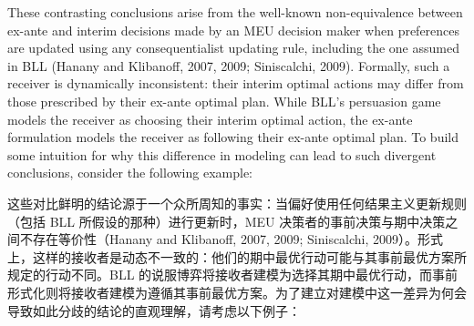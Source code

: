 \documentclass[12pt,a4paper]{article}
\theoremstyle{definition}
\theoremstyle{remark}
\newenvironment{original}{%
    \par\medskip\noindent%
    \begin{tcolorbox}[%
        colback=white,%
        colframe=black!50,%
        title=\textbf{Original English},%
        fonttitle=\small\bfseries,%
        left=0pt, right=0pt, top=2pt, bottom=2pt,%
        boxrule=0.5pt,%
        arc=0pt,%
        outer arc=0pt%
    ]%
    \small%
}{%
    \end{tcolorbox}%
}
\newenvironment{translation}{%
    \par\smallskip\noindent%
    \begin{tcolorbox}[%
        colback=blue!3!white,%
        colframe=blue!40!black,%
        title=\textbf{中文翻译},%
        fonttitle=\small\bfseries,%
        left=0pt, right=0pt, top=2pt, bottom=2pt,%
        boxrule=0.5pt,%
        arc=0pt,%
        outer arc=0pt%
    ]%
    \small\color{blue!60!black}%
}{%
    \end{tcolorbox}\medskip%
}
\begin{document}
\begin{original}
These contrasting conclusions arise from the well-known non-equivalence between ex-ante and interim decisions made by an MEU decision maker when preferences are updated using any consequentialist updating rule, including the one assumed in BLL (Hanany and Klibanoff, 2007, 2009; Siniscalchi, 2009). Formally, such a receiver is dynamically inconsistent: their interim optimal actions may differ from those prescribed by their ex-ante optimal plan. While BLL's persuasion game models the receiver as choosing their interim optimal action, the ex-ante formulation models the receiver as following their ex-ante optimal plan. To build some intuition for why this difference in modeling can lead to such divergent conclusions, consider the following example:
\end{original}
\begin{translation}
这些对比鲜明的结论源于一个众所周知的事实：当偏好使用任何结果主义更新规则（包括 BLL 所假设的那种）进行更新时，MEU 决策者的事前决策与期中决策之间不存在等价性（Hanany and Klibanoff, 2007, 2009; Siniscalchi, 2009）。形式上，这样的接收者是动态不一致的：他们的期中最优行动可能与其事前最优方案所规定的行动不同。BLL 的说服博弈将接收者建模为选择其期中最优行动，而事前形式化则将接收者建模为遵循其事前最优方案。为了建立对建模中这一差异为何会导致如此分歧的结论的直观理解，请考虑以下例子：
\end{translation}
\end{document}

